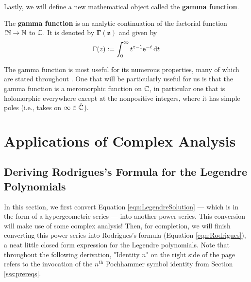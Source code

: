 \documentclass[titlepage]{article}
\numberwithin{equation}{section}
\begin{document}
Lastly, we will define a new mathematical object called the \textbf{gamma function}.
\begin{definition}
    The \textbf{gamma function} is an analytic continuation of the factorial function $!\N\to\N$ to $\C$. It is denoted by $\bm{\Gamma(z)}$ and given by
    \begin{equation*}
        \Gamma(z) := \int_0^\infty t^{z-1}\e[-t]\dd{t}
    \end{equation*}
\end{definition}
The gamma function is most useful for its numerous properties, many of which are stated throughout \textcite{bib:Seaborn}. One that will be particularly useful for us is that the gamma function is a meromorphic function on $\C$, in particular one that is holomorphic everywhere except at the nonpositive integers, where it has simple poles (i.e., takes on $\infty\in\hat{\C}$).
\newpage



\section{Applications of Complex Analysis}\label{sse:applications}
\subsection{Deriving Rodrigues's Formula for the Legendre Polynomials}
In this section, we first convert Equation \ref{eqn:LegendreSolution} --- which is in the form of a hypergeometric series --- into another power series. This conversion will make use of some complex analysis! Then, for completion, we will finish converting this power series into Rodrigues's formula (Equation \ref{eqn:Rodrigues}), a neat little closed form expression for the Legendre polynomials. Note that throughout the following derivation, "Identity $n$" on the right side of the page refers to the invocation of the $n^\text{th}$ Pochhammer symbol identity from Section \ref{sss:prereqs}.
\end{document}
